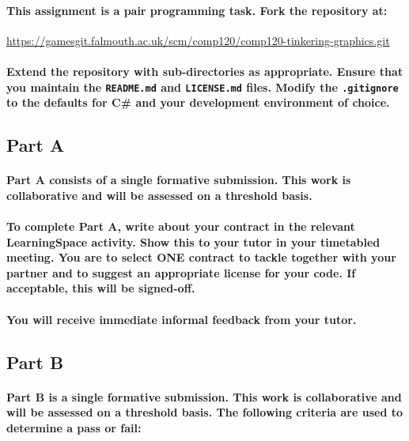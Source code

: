 \documentclass{../../fal_assignment}
\begin{document}
\paragraph{This assignment is a \textbf{pair programming task}. Fork the repository at:}

\url{https://gamesgit.falmouth.ac.uk/scm/comp120/comp120-tinkering-graphics.git}

\paragraph{Extend the repository with sub-directories as appropriate. Ensure that you maintain the \texttt{README.md} and \texttt{LICENSE.md} files. Modify the \texttt{.gitignore} to the defaults for \textbf{C\#} and your development environment of choice.}

\subsection*{Part A}

\paragraph{Part A consists of a \textbf{single formative submission}. This work is \textbf{collaborative} and will be assessed on a \textbf{threshold} basis.}

\paragraph{To complete Part A, write about your contract in the relevant LearningSpace activity. Show this to your tutor in your timetabled meeting. You are to select \textbf{ONE} contract to tackle together with your partner and to suggest an appropriate license for your code. If acceptable, this will be signed-off.}

\paragraph{You will receive immediate \textbf{informal feedback} from your \textbf{tutor}.}

\subsection*{Part B}

\paragraph{Part B is a \textbf{single formative submission}. This work is \textbf{collaborative} and will be assessed on a \textbf{threshold} basis. The following criteria are used to determine a pass or fail:}
\end{document}
